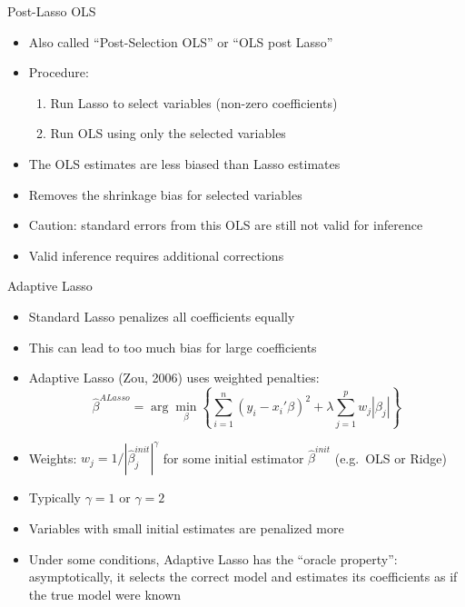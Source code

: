 \documentclass[aspectratio=169]{beamer}
\begin{document}
\begin{frame}{Post-Lasso OLS}
\begin{itemize}
    \item Also called ``Post-Selection OLS'' or ``OLS post Lasso''
    \item Procedure:
    \begin{enumerate}
        \item Run Lasso to select variables (non-zero coefficients)
        \item Run OLS using only the selected variables
    \end{enumerate}
    \item The OLS estimates are less biased than Lasso estimates
    \item Removes the shrinkage bias for selected variables
    \item Caution: standard errors from this OLS are still not valid for inference
    \item Valid inference requires additional corrections
\end{itemize}
\end{frame}

\begin{frame}{Adaptive Lasso}
\begin{itemize}
    \item Standard Lasso penalizes all coefficients equally
    \item This can lead to too much bias for large coefficients
    \item Adaptive Lasso (Zou, 2006) uses weighted penalties:
    \[\hat{\beta}^{ALasso} = \arg\min_{\beta} \left\{ \sum_{i=1}^{n}(y_i - x_i'\beta)^2 + \lambda \sum_{j=1}^{p}w_j|\beta_j| \right\}\]
    \item Weights: $w_j = 1/|\hat{\beta}_j^{init}|^\gamma$ for some initial estimator $\hat{\beta}^{init}$ (e.g.\ OLS or Ridge)
    \item Typically $\gamma = 1$ or $\gamma = 2$
    \item Variables with small initial estimates are penalized more
    \item Under some conditions, Adaptive Lasso has the ``oracle property'': asymptotically, it selects the correct model and estimates its coefficients as if the true model were known
\end{itemize}
\end{frame}

\end{document}

